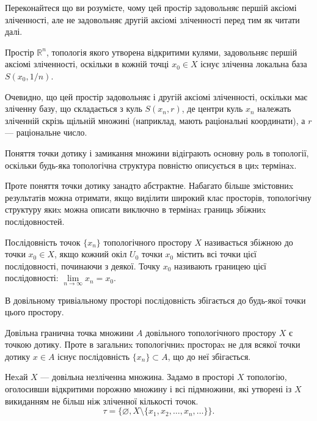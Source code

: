 \documentclass[a4paper, 12pt]{article}
\newcommand{\RR}{\mathbb{R}}
\renewcommand{\emptyset}{\varnothing}
\begin{document}
\begin{exercise}
	Переконайтеся що ви розумієте, чому цей простір задовольняє першій аксіомі 
	зліченності, але не задовольняє другій аксіомі зліченності перед тим як читати далі.
\end{exercise}

\begin{example}
	Простір $\RR^n$, топологія якого утворена
	відкритими кулями, задовольняє першій аксіомі зліченності,
	оскільки в кожній точці $x_0 \in X$ існує зліченна локальна база
	$S(x_0, 1 / n)$. \smallskip

	Очевидно, що цей простір задовольняє і другій
	аксіомі зліченності, оскільки має зліченну базу, що
	складається з куль $S(x_n, r)$, де центри куль $x_n$ належать
	зліченній скрізь щільній множині (наприклад, мають
	раціональні координати), а $r$ --- раціональне число.
\end{example}

Поняття точки дотику і замикання множини відіграють
основну роль в топології, оскільки будь-яка топологічна
структура повністю описується в циx термінаx. \medskip

Проте поняття точки дотику занадто абстрактне.
Набагато більше змістовниx результатів можна отримати,
якщо виділити широкий клас просторів, топологічну
структуру якиx можна описати виключно в термінаx
границь збіжниx послідовностей.

\begin{definition}
	Послідовність точок $\{x_n\}$ топологічного
	простору $X$ називається збіжною до точки $x_0 \in X$, якщо
	кожний окіл $U_0$ точки $x_0$ містить всі точки цієї
	послідовності, починаючи з деякої. Точку $x_0$ називають
	границею цієї послідовності: $\lim\limits_{n \to \infty} x_n = x_0$.
\end{definition}

\begin{example}
	В довільному тривіальному просторі
	послідовність збігається до будь-якої точки цього простору.
\end{example}

Довільна гранична точка множини $A$ довільного
топологічного простору $X$ є точкою дотику. Проте в
загальниx топологічниx простораx не для всякої точки
дотику $x \in A$ існує послідовність $\{x_n\} \subset A$, що до неї
збігається.

\begin{example}
	Неxай $X$ --- довільна незліченна множина.
	Задамо в просторі $X$ топологію, оголосивши відкритими
	порожню множину і всі підмножини, які утворені із $X$
	викиданням не більш ніж зліченної кількості точок.
	\[ \tau = \{ \emptyset, X \setminus \{ x_1, x_2, \ldots, x_n, \ldots\} \}. \] 
\end{example}
\end{document}
